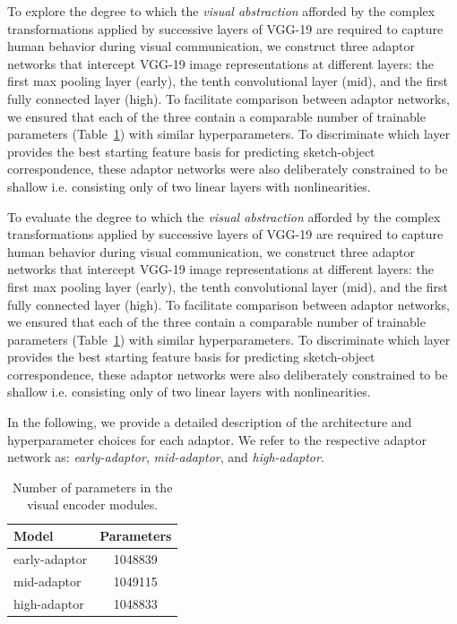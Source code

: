 \documentclass[9pt,twocolumn,twoside]{pnas-new}
\begin{document}
{To explore the degree to which the \textit{visual abstraction} afforded by the complex transformations applied by successive layers of VGG-19 are required to capture human behavior during visual communication, we construct three adaptor networks that intercept VGG-19 image representations at different layers: the first max pooling layer (early), the tenth convolutional layer (mid), and the first fully connected layer (high). To facilitate comparison between adaptor networks, we ensured that each of the three contain a comparable number of trainable parameters (Table~\ref{table:parameters}) with similar hyperparameters. To discriminate which layer provides the best starting feature basis for predicting sketch-object correspondence, these adaptor networks were also deliberately constrained to be shallow i.e. consisting only of two linear layers with nonlinearities.

To evaluate the degree to which the \textit{visual abstraction} afforded by the complex transformations applied by successive layers of VGG-19 are required to capture human behavior during visual communication, we construct three adaptor networks that intercept VGG-19 image representations at different layers: the first max pooling layer (early), the tenth convolutional layer (mid), and the first fully connected layer (high). To facilitate comparison between adaptor networks, we ensured that each of the three contain a comparable number of trainable parameters (Table~\ref{table:parameters}) with similar hyperparameters. To discriminate which layer provides the best starting feature basis for predicting sketch-object correspondence, these adaptor networks were also deliberately constrained to be shallow i.e. consisting only of two linear layers with nonlinearities.

In the following, we provide a detailed description of the architecture and hyperparameter choices for each adaptor. We refer to the respective adaptor network as: \textit{early-adaptor}, \textit{mid-adaptor}, and \textit{high-adaptor}.

\begin{table}
\centering
\begin{tabular}{| l | c |}
\hline
Model & Parameters \\
\hline
\hline
early-adaptor & 1048839 \\
\hline
mid-adaptor & 1049115 \\
\hline
high-adaptor & 1048833 \\
\hline
\end{tabular}
\caption{Number of parameters in the visual encoder modules.}
\label{table:parameters}
\end{table}

}
\end{document}
